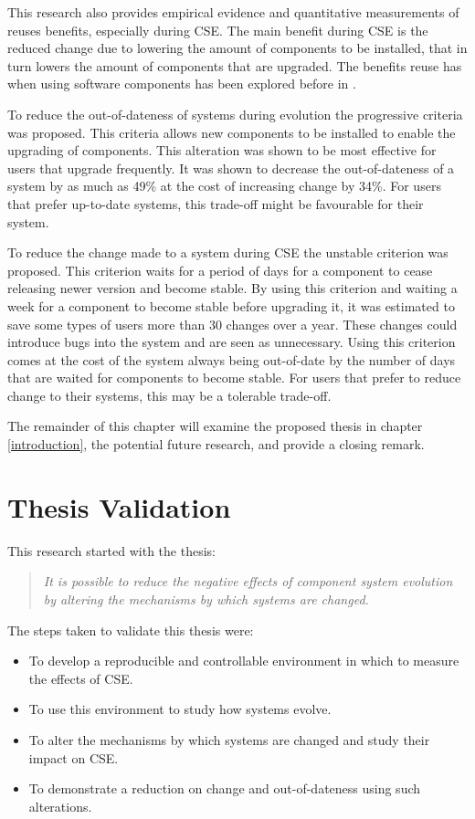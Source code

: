 This research also provides empirical evidence and quantitative measurements of reuses benefits, especially during CSE.
The main benefit during CSE is the reduced change due to lowering the amount of components to be installed,
that in turn lowers the amount of components that are upgraded.
The benefits reuse has when using software components has been explored before in \cite{Szyperski2002}.

To reduce the out-of-dateness of systems during evolution the progressive criteria was proposed.
This criteria allows new components to be installed to enable the upgrading of components.
This alteration was shown to be most effective for users that upgrade frequently.
It was shown to decrease the out-of-dateness of a system by as much as 49\% at the cost of increasing change by 34\%.
For users that prefer up-to-date systems, this trade-off might be favourable for their system.

To reduce the change made to a system during CSE the unstable criterion was proposed.
This criterion waits for a period of days for a component to cease releasing newer version and become stable.
By using this criterion and waiting a week for a component to become stable before upgrading it, it was estimated to save some types of users more than 30 changes over a year.
These changes could introduce bugs into the system and are seen as unnecessary. 
Using this criterion comes at the cost of the system always being out-of-date by the number of days that are waited for components to become stable.
For users that prefer to reduce change to their systems, this may be a tolerable trade-off.

The remainder of this chapter will examine the proposed thesis in chapter \ref{introduction},
the potential future research,
and provide a closing remark.
\section{Thesis Validation}
This research started with the thesis:
\begin{quote}
\textit{It is possible to reduce the negative effects of component system evolution by altering the mechanisms by which systems are changed.} 
\end{quote}

The steps taken to validate this thesis were:
\begin{itemize}
  \item To develop a reproducible and controllable environment in which to measure the effects of CSE.
  \item To use this environment to study how systems evolve.
  \item To alter the mechanisms by which systems are changed and study their impact on CSE.
  \item To demonstrate a reduction on change and out-of-dateness using such alterations.
\end{itemize}

